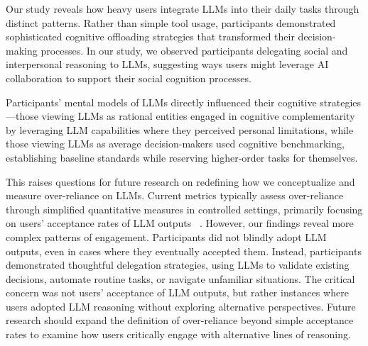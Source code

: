 Our study reveals how heavy users integrate LLMs into their daily tasks through distinct patterns. Rather than simple tool usage, participants demonstrated sophisticated cognitive offloading strategies that transformed their decision-making processes. In our study, we observed participants delegating social and interpersonal reasoning to LLMs, suggesting ways users might leverage AI collaboration to support their social cognition processes.

Participants' mental models of LLMs directly influenced their cognitive strategies---those viewing LLMs as rational entities engaged in cognitive complementarity by leveraging LLM capabilities where they perceived personal limitations, while those viewing LLMs as average decision-makers used cognitive benchmarking, establishing baseline standards while reserving higher-order tasks for themselves.

This raises questions for future research on redefining how we conceptualize and measure over-reliance on LLMs. Current metrics typically assess over-reliance through simplified quantitative measures in controlled settings, primarily focusing on users' acceptance rates of LLM outputs ~\cite{bo2024rely, kim2024rely}. However, our findings reveal more complex patterns of engagement. Participants did not blindly adopt LLM outputs, even in cases where they eventually accepted them. Instead, participants demonstrated thoughtful delegation strategies, using LLMs to validate existing decisions, automate routine tasks, or navigate unfamiliar situations. The critical concern was not users' acceptance of LLM outputs, but rather instances where users adopted LLM reasoning without exploring alternative perspectives. Future research should expand the definition of over-reliance beyond simple acceptance rates to examine how users critically engage with alternative lines of reasoning.

